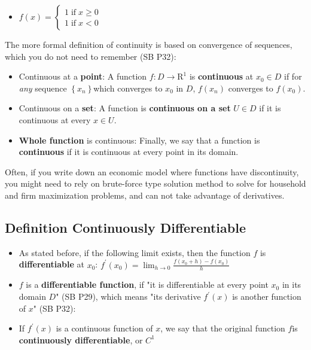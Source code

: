 \documentclass[
]{book}
\providecommand{\tightlist}{%
  \setlength{\itemsep}{0pt}\setlength{\parskip}{0pt}}
\begin{document}
\begin{itemize}
\tightlist
\item
  \(\displaystyle f(x)=\left\lbrace \begin{array}{c} 1\;\textrm{if}\;x\ge 0\\ 1\;\textrm{if}\;x<0 \end{array}\right.\)
\end{itemize}

The more formal definition of continuity is based on convergence of
sequences, which you do not need to remember (SB P32):

\begin{itemize}
\item
  Continuous at a \textbf{point}: A function \(f:D\to {{{\textrm{R}}}}^1\) is
  \textbf{continuous} at \(x_0 \in D\) if for \emph{any} sequence
  \(\left\lbrace x_n \right\rbrace\)which converges to \(x_0\) in \(D\),
  \(f(x_n )\) converges to \(f(x_0 )\).
\item
  Continuous on a \textbf{set}: A function is \textbf{continuous on a set}
  \(U\in D\) if it is continuous at every \(x\in U\).
\item
  \textbf{Whole function} is continuous: Finally, we say that a function is
  \textbf{continuous} if it is continuous at every point in its domain.
\end{itemize}

Often, if you write down an economic model where functions have
discontinuity, you might need to rely on brute-force type solution
method to solve for household and firm maximization problems, and can
not take advantage of derivatives.

\hypertarget{definition-continuously-differentiable}{%
\subsection{Definition Continuously Differentiable}\label{definition-continuously-differentiable}}

\begin{itemize}
\item
  As stated before, if the following limit exists, then the function
  \(f\) is \textbf{differentiable} at \(x_0\):
  \(f^{\prime } (x_0 )=\lim_{h\to 0} \frac{f(x_0 +h)-f(x_0 )}{h}\)
\item
  \(f\) is a \textbf{differentiable function}, if "it is differentiable at
  every point \(x_0\) in its domain \(D\)" (SB P29), which means "its
  derivative \(f^{\prime } (x)\) is another function of \(x\)" (SB P32):
\item
  If \(f^{\prime } (x)\) is a continuous function of \(x\), we say that
  the original function \(f\)is \textbf{continuously differentiable}, or
  \(C^{{{\textrm{1}}}}\)
\end{itemize}
\end{document}
